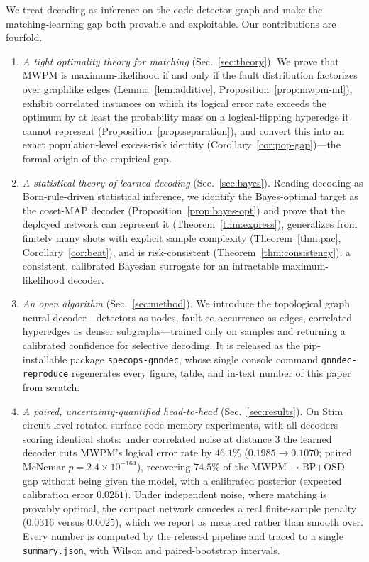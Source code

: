 \documentclass[aps,prxquantum,twocolumn,superscriptaddress,nofootinbib,longbibliography]{revtex4-2}
\newcommand{\res}[1]{#1}
\begin{document}
We treat decoding as inference on the code detector graph and make the
matching-learning gap both provable and exploitable. Our contributions are
fourfold.
\begin{enumerate}[leftmargin=1.6em]
  \item \emph{A tight optimality theory for matching}
  (Sec.~\ref{sec:theory}). We prove that MWPM is maximum-likelihood if and only
  if the fault distribution factorizes over graphlike edges
  (Lemma~\ref{lem:additive}, Proposition~\ref{prop:mwpm-ml}), exhibit correlated
  instances on which its logical error rate exceeds the optimum by at least the
  probability mass on a logical-flipping hyperedge it cannot represent
  (Proposition~\ref{prop:separation}), and convert this into an exact
  population-level excess-risk identity (Corollary~\ref{cor:pop-gap})---the
  formal origin of the empirical gap.
  \item \emph{A statistical theory of learned decoding}
  (Sec.~\ref{sec:bayes}). Reading decoding as Born-rule-driven statistical
  inference, we identify the Bayes-optimal target as the coset-MAP decoder
  (Proposition~\ref{prop:bayes-opt}) and prove that the deployed network can
  represent it (Theorem~\ref{thm:express}), generalizes from finitely many shots
  with explicit sample complexity (Theorem~\ref{thm:pac},
  Corollary~\ref{cor:beat}), and is risk-consistent
  (Theorem~\ref{thm:consistency}): a consistent, calibrated Bayesian surrogate
  for an intractable maximum-likelihood decoder.
  \item \emph{An open algorithm} (Sec.~\ref{sec:method}). We introduce the
  topological graph neural decoder---detectors as nodes, fault co-occurrence as
  edges, correlated hyperedges as denser subgraphs---trained only on samples and
  returning a calibrated confidence for selective decoding. It is released as
  the pip-installable package \texttt{specops-gnndec}, whose single console
  command \texttt{gnndec-reproduce} regenerates every figure, table, and
  in-text number of this paper from scratch.
  \item \emph{A paired, uncertainty-quantified head-to-head}
  (Sec.~\ref{sec:results}). On Stim circuit-level rotated surface-code memory
  experiments, with all decoders scoring identical shots: under correlated
  noise at distance $3$ the learned decoder cuts MWPM's logical error rate by
  $\res{46.1}\%$ ($\res{0.1985}\to\res{0.1070}$; paired McNemar
  $p=\res{2.4\times10^{-164}}$), recovering $\res{74.5}\%$ of the
  MWPM$\to$BP+OSD gap without being given the model, with a calibrated
  posterior (expected calibration error $\res{0.0251}$). Under independent
  noise, where matching is provably optimal, the compact network concedes a
  real finite-sample penalty ($\res{0.0316}$ versus $\res{0.0025}$), which we
  report as measured rather than smooth over. Every number is computed by the
  released pipeline and traced to a single \texttt{summary.json}, with Wilson
  and paired-bootstrap intervals.
\end{enumerate}
\end{document}
